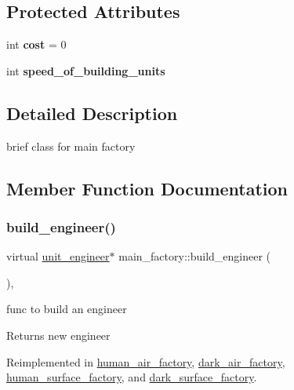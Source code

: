 \subsection*{Protected Attributes}
\begin{DoxyCompactItemize}
\item 
\mbox{\label{classmain__factory_a76035fcad2dd7ee86e084b30240e6d8a}} 
int {\bfseries cost} = 0
\item 
\mbox{\label{classmain__factory_aeffe2b762881074eef0c489d20e2aca3}} 
int {\bfseries speed\+\_\+of\+\_\+building\+\_\+units}
\end{DoxyCompactItemize}


\subsection{Detailed Description}
brief class for main factory 

\subsection{Member Function Documentation}
\mbox{\label{classmain__factory_ac970fe346638331722123f2bb240b590}} 
\subsubsection{\texorpdfstring{build\+\_\+engineer()}{build\_engineer()}}
{\footnotesize\ttfamily virtual \mbox{\hyperlink{classunit__engineer}{unit\+\_\+engineer}}$\ast$ main\+\_\+factory\+::build\+\_\+engineer (\begin{DoxyParamCaption}{ }\end{DoxyParamCaption})\hspace{0.3cm}{\ttfamily [inline]}, {\ttfamily [virtual]}}

func to build an engineer \begin{DoxyReturn}{Returns}
new engineer 
\end{DoxyReturn}


Reimplemented in \mbox{\hyperlink{classhuman__air__factory_a34707f920a66afe9af4d5b0ecef8b2a7}{human\+\_\+air\+\_\+factory}}, \mbox{\hyperlink{classdark__air__factory_aaabd99e42553b5514b2fae2967bc3248}{dark\+\_\+air\+\_\+factory}}, \mbox{\hyperlink{classhuman__surface__factory_a9ededd3065e7550d90fe7038daf96564}{human\+\_\+surface\+\_\+factory}}, and \mbox{\hyperlink{classdark__surface__factory_a70172395b97a039eed8e3ff193f9f6a6}{dark\+\_\+surface\+\_\+factory}}.

